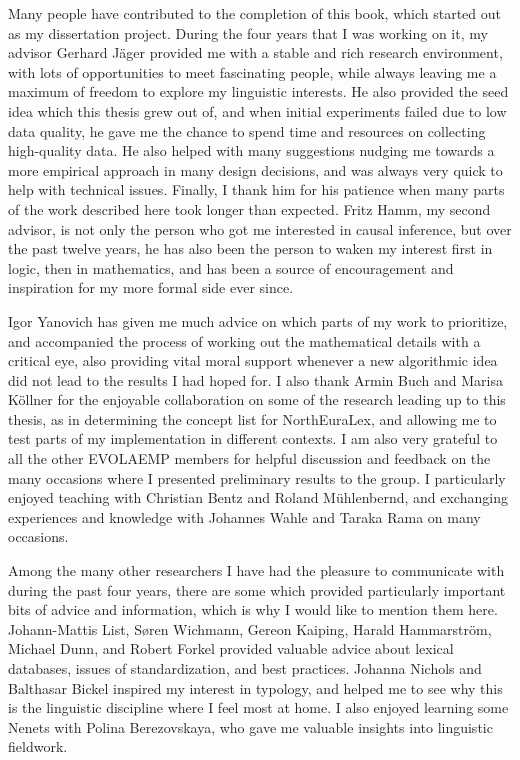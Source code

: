 \addchap{\lsAcknowledgementTitle} 

Many people have contributed to the completion of this book, which started out as my dissertation project. During the four years that I was working on it, my advisor Gerhard Jäger provided me with a stable and rich research environment, with lots of opportunities to meet fascinating people, while always leaving me a maximum of freedom to explore my linguistic interests. He also provided the seed idea which this thesis grew out of, and when initial experiments failed due to low data quality, he gave me the chance to spend time and resources on collecting high-quality data. He also helped with many suggestions nudging me towards a more empirical approach in many design decisions, and was always very quick to help with technical issues. Finally, I thank him for his patience when many parts of the work described here took longer than expected. Fritz Hamm, my second advisor, is not only the person who got me interested in causal inference, but over the past twelve years, he has also been the person to waken my interest first in logic, then in mathematics, and has been a source of encouragement and inspiration for my more formal side ever since.

Igor Yanovich has given me much advice on which parts of my work to prioritize, and accompanied the process of working out the mathematical details with a critical eye, also providing vital moral support whenever a new algorithmic idea did not lead to the results I had hoped for. I also thank Armin Buch and Marisa Köllner for the enjoyable collaboration on some of the research leading up to this thesis, as in determining the concept list for NorthEuraLex, and allowing me to test parts of my implementation in different contexts. I am also very grateful to all the other EVOLAEMP members for helpful discussion and feedback on the many occasions where I presented preliminary results to the group. I particularly enjoyed teaching with Christian Bentz and Roland Mühlenbernd, and exchanging experiences and knowledge with Johannes Wahle and Taraka Rama on many occasions.

Among the many other researchers I have had the pleasure to communicate with during the past four years, there are some which provided particularly important bits of advice and information, which is why I would like to mention them here. Johann-Mattis List, Søren Wichmann, Gereon Kaiping, Harald Hammarström, Michael Dunn, and Robert Forkel provided valuable advice about lexical databases, issues of standardization, and best practices. Johanna Nichols and Balthasar Bickel inspired my interest in typology, and helped me to see why this is the linguistic discipline where I feel most at home. I also enjoyed learning some Nenets with Polina Berezovskaya, who gave me valuable insights into linguistic fieldwork.

